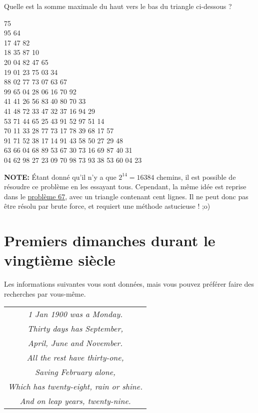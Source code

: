 Quelle est la somme maximale du haut vers le bas du triangle ci-dessous ?

\begin{center}
    75\\95 64\\17 47 82\\18 35 87 10\\20 04 82 47 65\\19 01 23 75 03 34\\88 02 77 73 07 63 67\\99 65 04 28 06 16 70 92\\41 41 26 56 83 40 80 70 33\\41 48 72 33 47 32 37 16 94 29\\53 71 44 65 25 43 91 52 97 51 14\\70 11 33 28 77 73 17 78 39 68 17 57\\91 71 52 38 17 14 91 43 58 50 27 29 48\\63 66 04 68 89 53 67 30 73 16 69 87 40 31\\04 62 98 27 23 09 70 98 73 93 38 53 60 04 23\\
\end{center}

\textbf{NOTE:} Étant donné qu'il n'y a que $2^{14}=16384$ chemins, il est possible de résoudre ce problème en les essayant tous.
Cependant, la même idée est reprise dans le \hyperref[pb.067]{problème 67}, avec un triangle contenant cent lignes. Il ne peut donc pas être résolu par brute force, et requiert une méthode astucieuse ! ;o)


\section{Premiers dimanches durant le vingtième siècle} \label{pb.019}
Les informations suivantes vous sont données, mais vous pouvez préférer faire des recherches par vous-même.
\begin{center}
    \begin{tabular}{c}
        \textit{1 Jan 1900 was a Monday.}\\
        \textit{Thirty days has September,}\\
        \textit{April, June and November.}\\
        \textit{All the rest have thirty-one,}\\
        \textit{Saving February alone,}\\
        \textit{Which has twenty-eight, rain or shine.}\\
        \textit{And on leap years, twenty-nine.}\\
    \end{tabular}
\end{center}
    
